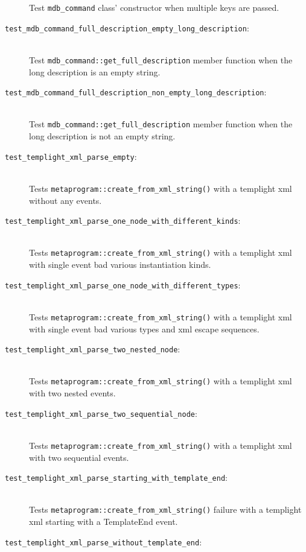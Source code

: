 \begin{description}
        Test \texttt{mdb\_command} class' constructor when multiple keys are
        passed.
    \item[\texttt{test\_mdb\_command\_full\_description\_empty\_long\_description}:] \hfill \\
        Test \texttt{mdb\_command::get\_full\_description} member function when
        the long description is an empty string.
    \item[\texttt{test\_mdb\_command\_full\_description\_non\_empty\_long\_description}:] \hfill \\
        Test \texttt{mdb\_command::get\_full\_description} member function when
        the long description is not an empty string.
    \item[\texttt{test\_templight\_xml\_parse\_empty}:] \hfill \\
        Tests \texttt{metaprogram::create\_from\_xml\_string()} with a templight
        xml without any events.
    \item[\texttt{test\_templight\_xml\_parse\_one\_node\_with\_different\_kinds}:] \hfill \\
        Tests \texttt{metaprogram::create\_from\_xml\_string()} with a templight
        xml with single event bad various instantiation kinds.
    \item[\texttt{test\_templight\_xml\_parse\_one\_node\_with\_different\_types}:] \hfill \\
        Tests \texttt{metaprogram::create\_from\_xml\_string()} with a templight
        xml with single event bad various types and xml escape sequences.
    \item[\texttt{test\_templight\_xml\_parse\_two\_nested\_node}:] \hfill \\
        Tests \texttt{metaprogram::create\_from\_xml\_string()} with a templight
        xml with two nested events.
    \item[\texttt{test\_templight\_xml\_parse\_two\_sequential\_node}:] \hfill \\
        Tests \texttt{metaprogram::create\_from\_xml\_string()} with a templight
        xml with two sequential events.
    \item[\texttt{test\_templight\_xml\_parse\_starting\_with\_template\_end}:] \hfill \\
        Tests \texttt{metaprogram::create\_from\_xml\_string()} failure with a
        templight xml starting with a TemplateEnd event.
    \item[\texttt{test\_templight\_xml\_parse\_without\_template\_end}:] \hfill \\

\end{description}

